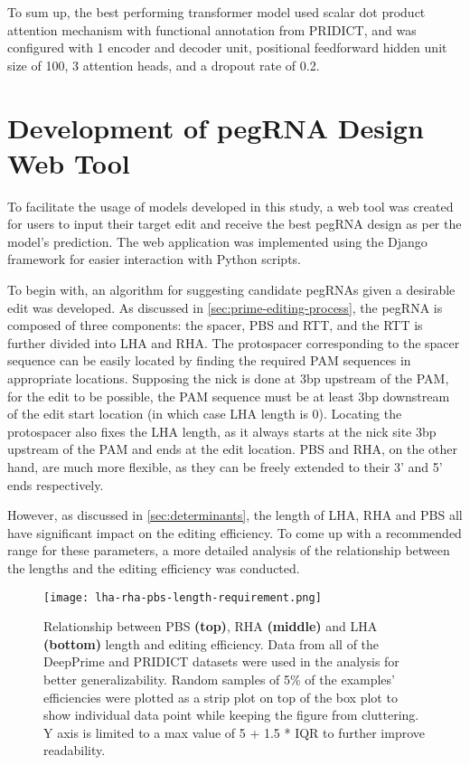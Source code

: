 To sum up, the best performing transformer model used scalar dot product attention mechanism with functional annotation from PRIDICT, and was configured with 1 encoder and decoder unit, positional feedforward hidden unit size of 100, 3 attention heads, and a dropout rate of 0.2. 

\section{Development of pegRNA Design Web Tool}

To facilitate the usage of models developed in this study, a web tool was created for users to input their target edit and receive the best pegRNA design as per the model's prediction. The web application was implemented using the Django framework for easier interaction with Python scripts. 

To begin with, an algorithm for suggesting candidate pegRNAs given a desirable edit was developed. As discussed in \autoref{sec:prime-editing-process}, the pegRNA is composed of three components: the spacer, PBS and RTT, and the RTT is further divided into LHA and RHA. The protospacer corresponding to the spacer sequence can be easily located by finding the required PAM sequences in appropriate locations.
Supposing the nick is done at 3bp upstream of the PAM, for the edit to be possible, the PAM sequence must be at least 3bp downstream of the edit start location (in which case LHA length is 0). Locating the protospacer also fixes the LHA length, as it always starts at the nick site 3bp upstream of the PAM and ends at the edit location. PBS and RHA, on the other hand, are much more flexible, as they can be freely extended to their 3' and 5' ends respectively.

However, as discussed in \autoref{sec:determinants}, the length of LHA, RHA and PBS all have significant impact on the editing efficiency. To come up with a recommended range for these parameters, a more detailed analysis of the relationship between the lengths and the editing efficiency was conducted.

\begin{figure}
    \texttt{[image: lha-rha-pbs-length-requirement.png]}
    \caption[Relationship between LHA, RHA and PBS length and editing efficiency]{Relationship between PBS \textbf{(top)}, RHA \textbf{(middle)} and LHA \textbf{(bottom)} length and editing efficiency. Data from all of the DeepPrime and PRIDICT datasets were used in the analysis for better generalizability. Random samples of 5\% of the examples' efficiencies were plotted as a strip plot on top of the box plot to show individual data point while keeping the figure from cluttering. Y axis is limited to a max value of 5 + 1.5 * IQR to further improve readability. }
    \label{fig:lha-rha-pbs-length}
\end{figure}


